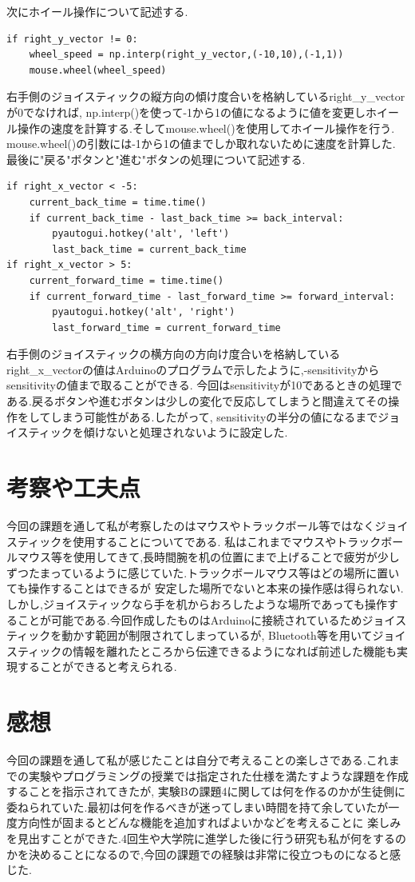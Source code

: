 \documentclass[dvipdfmx]{jarticle}
\begin{document}
次にホイール操作について記述する.
\begin{lstlisting}
if right_y_vector != 0:
    wheel_speed = np.interp(right_y_vector,(-10,10),(-1,1))
    mouse.wheel(wheel_speed)
\end{lstlisting}
右手側のジョイスティックの縦方向の傾け度合いを格納しているright\_y\_vectorが0でなければ,
np.interp()を使って-1から1の値になるように値を変更しホイール操作の速度を計算する.そしてmouse.wheel()を使用してホイール操作を行う.
mouse.wheel()の引数には-1から1の値までしか取れないために速度を計算した.\\
最後に"戻る"ボタンと"進む"ボタンの処理について記述する.
\begin{lstlisting}
if right_x_vector < -5:
    current_back_time = time.time()
    if current_back_time - last_back_time >= back_interval:
        pyautogui.hotkey('alt', 'left')
        last_back_time = current_back_time
if right_x_vector > 5:
    current_forward_time = time.time()
    if current_forward_time - last_forward_time >= forward_interval:
        pyautogui.hotkey('alt', 'right')
        last_forward_time = current_forward_time
\end{lstlisting}
右手側のジョイスティックの横方向の方向け度合いを格納しているright\_x\_vectorの値はArduinoのプログラムで示したように,-sensitivityからsensitivityの値まで取ることができる.
今回はsensitivityが10であるときの処理である.戻るボタンや進むボタンは少しの変化で反応してしまうと間違えてその操作をしてしまう可能性がある.したがって,
sensitivityの半分の値になるまでジョイスティックを傾けないと処理されないように設定した.
\section{考察や工夫点}
今回の課題を通して私が考察したのはマウスやトラックボール等ではなくジョイスティックを使用することについてである.
私はこれまでマウスやトラックボールマウス等を使用してきて,長時間腕を机の位置にまで上げることで疲労が少しずつたまっているように感じていた.トラックボールマウス等はどの場所に置いても操作することはできるが
安定した場所でないと本来の操作感は得られない.しかし,ジョイスティックなら手を机からおろしたような場所であっても操作することが可能である.今回作成したものはArduinoに接続されているためジョイスティックを動かす範囲が制限されてしまっているが,
Bluetooth等を用いてジョイスティックの情報を離れたところから伝達できるようになれば前述した機能も実現することができると考えられる.
\section{感想}
今回の課題を通して私が感じたことは自分で考えることの楽しさである.これまでの実験やプログラミングの授業では指定された仕様を満たすような課題を作成することを指示されてきたが,
実験Bの課題4に関しては何を作るのかが生徒側に委ねられていた.最初は何を作るべきが迷ってしまい時間を持て余していたが一度方向性が固まるとどんな機能を追加すればよいかなどを考えることに
楽しみを見出すことができた.4回生や大学院に進学した後に行う研究も私が何をするのかを決めることになるので,今回の課題での経験は非常に役立つものになると感じた.
\end{document}
